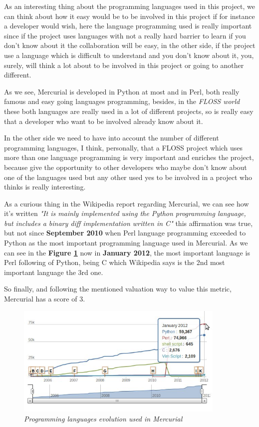 \documentclass[a4paper,10pt]{article}
\begin{document}
As an interesting thing about the programming languages used in this project,
we can think about how it easy would be to be involved in this project if for
instance a developer would wish, here the language programming used is really
important since if the project uses languages with not a really hard barrier to
learn if you don't know about it the collaboration will be easy, in the other
side, if the project use a language which is difficult to understand and you
don't know about it, you, surely, will think a lot about to be involved in this
project or going to another different.

As we see, Mercurial is developed in Python at most and in Perl, both really
famous and easy going languages programming, besides, in the \textit{FLOSS
world}
these both languages are really used in a lot of different projects, so is
really easy that a developer who want to be involved already know about it.

In the other side we need to have into account the number of different
programming languages, I think, personally, that a FLOSS project which uses
more than one language programming is very important and enriches the project,
because give the opportunity to other developers who maybe don't know about one
of the languages used but any other used yes to be involved in a project who
thinks is really interesting.

As a curious thing in the Wikipedia report regarding Mercurial\cite{Mercurial
(Wikipedia)}, 
we can see how it's written \textit{"It is mainly implemented using the Python
programming language, but includes a binary diff implementation written in C"}
this affirmation was true, but not since \textbf{September 2010} when Perl
language programming exceeded to Python as the most important programming
language used in Mercurial.
As we can see in the \textbf{Figure \ref{figure:mercurial_languages_evo}} now
in \textbf{January 2012}, the most important language is Perl following of
Python, being C which Wikipedia says is the 2nd most important language the 3rd
one.

So finally, and following the mentioned valuation way to value this metric,
Mercurial has a score of 3.


\begin{figure}[H]
    \centering
    \includegraphics[width=10cm, keepaspectratio]{img/mercurial_languages_evo.jpg}
    \caption{\textit{Programming languages evolution used in Mercurial}}
    \label{figure:mercurial_languages_evo}
 \end{figure}
\end{document}
